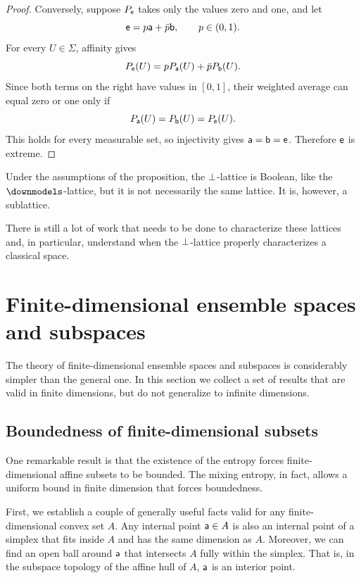 \begin{mathSection}
\begin{proof}
	Conversely, suppose $P_{\ens}$ takes only the values zero and one, and let
	\begin{equation}
		\ens = p\ens[a]+\bar{p}\ens[b],
		\qquad p \in (0,1).
	\end{equation}
	For every $U \in \Sigma$, affinity gives
	\begin{equation}
		P_{\ens}(U)
		= pP_{\ens[a]}(U)+\bar{p}P_{\ens[b]}(U).
	\end{equation}
	Since both terms on the right have values in $[0,1]$, their weighted average can equal zero or one only if
	\begin{equation}
		P_{\ens[a]}(U)
		= P_{\ens[b]}(U)
		= P_{\ens}(U).
	\end{equation}
	This holds for every measurable set, so injectivity gives $\ens[a]=\ens[b]=\ens$. Therefore $\ens$ is extreme.
\end{proof}

\begin{remark}
	Under the assumptions of the proposition, the $\ortho$-lattice is Boolean, like the $\separate$-lattice, but it is not necessarily the same lattice. It is, however, a sublattice.
\end{remark}
\end{mathSection}

There is still a lot of work that needs to be done to characterize these lattices and, in particular, understand when the $\ortho$-lattice properly characterizes a classical space.

\section{Finite-dimensional ensemble spaces and subspaces}

The theory of finite-dimensional ensemble spaces and subspaces is considerably simpler than the general one. In this section we collect a set of results that are valid in finite dimensions, but do not generalize to infinite dimensions.

\subsection{Boundedness of finite-dimensional subsets}

One remarkable result is that the existence of the entropy forces finite-dimensional affine subsets to be bounded. The mixing entropy, in fact, allows a uniform bound in finite dimension that forces boundedness.

First, we establish a couple of generally useful facts valid for any finite-dimensional convex set $A$. Any internal point $\ens[a] \in A$ is also an internal point of a simplex that fits inside $A$ and has the same dimension as $A$. Moreover, we can find an open ball around $\ens[a]$ that intersects $A$ fully within the simplex. That is, in the subspace topology of the affine hull of $A$, $\ens[a]$ is an interior point.


